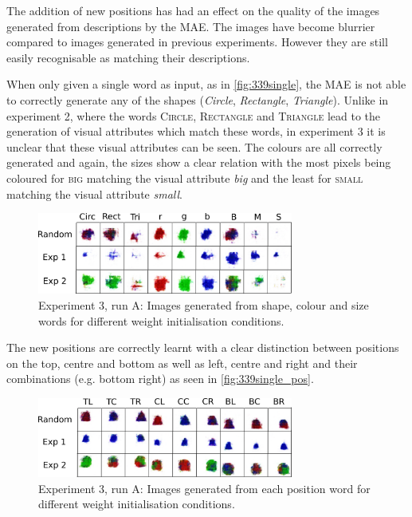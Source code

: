 The addition of new positions has had an effect on the quality of the images generated from descriptions by the MAE. The images have become blurrier compared to images generated in previous experiments. However they are still easily recognisable as matching their descriptions.

When only given a single word as input, as in \autoref{fig:339single}, the MAE is not able to correctly generate any of the shapes (\textit{Circle}, \textit{Rectangle}, \textit{Triangle}). Unlike in experiment 2, where the words \textsc{Circle}, \textsc{Rectangle} and \textsc{Triangle} lead to the generation of visual attributes which match these words, in experiment 3 it is unclear that these visual attributes can be seen.
The colours are all correctly generated and again, the sizes show a clear relation with the most pixels being coloured for \textsc{big} matching the visual attribute \textit{big} and the least for \textsc{small} matching the visual attribute \textit{small}.

\begin{figure}[h]
\centering
\includegraphics[width=0.75\textwidth]{Figs/shapes/singlelabel339.png}
\caption{Experiment 3, run A: Images generated from shape, colour and size words for different weight initialisation conditions.}
\label{fig:339single}
\end{figure}

The new positions are correctly learnt with a clear distinction between positions on the top, centre and bottom as well as left, centre and right and their combinations (e.g. bottom right) as seen in \autoref{fig:339single_pos}.

\begin{figure}[h]
\centering
\includegraphics[width=0.75\textwidth]{Figs/shapes/singlelabel339_pos.png}
\caption{Experiment 3, run A: Images generated from each position word for different weight initialisation conditions.}
\label{fig:339single_pos}
\end{figure}


